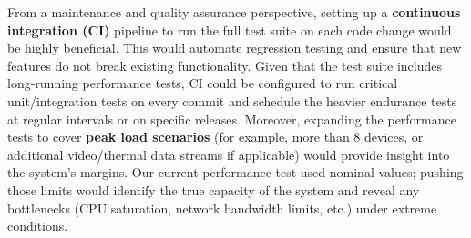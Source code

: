 From a maintenance and quality assurance perspective, setting up a \textbf{continuous integration (CI)} pipeline to run the full test suite on each code change would be highly beneficial. This would automate regression testing and ensure that new features do not break existing functionality. Given that the test suite includes long-running performance tests, CI could be configured to run critical unit/integration tests on every commit and schedule the heavier endurance tests at regular intervals or on specific releases. Moreover, expanding the performance tests to cover \textbf{peak load scenarios} (for example, more than 8 devices, or additional video/thermal data streams if applicable) would provide insight into the system's margins. Our current performance test used nominal values; pushing those limits would identify the true capacity of the system and reveal any bottlenecks (CPU saturation, network bandwidth limits, etc.) under extreme conditions.
